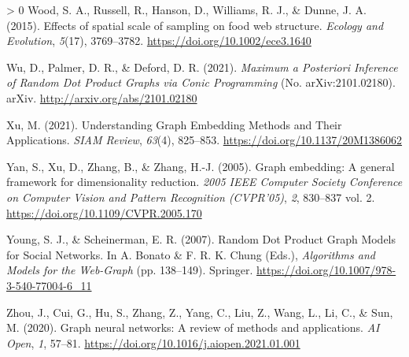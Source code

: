 \documentclass[11pt]{article}
\newlength{\cslhangindent}
\newenvironment{CSLReferences}[3] %
 {%
  \setlength{\parindent}{0pt}
  \ifodd #1 \everypar{\setlength{\hangindent}{\cslhangindent}}\ignorespaces\fi
  \ifnum #2 > 0
  \setlength{\parskip}{#2\baselineskip}
  \fi
 }%
 {}
\begin{document}
\begin{CSLReferences}{1}{0}
\leavevmode\hypertarget{ref-Wood2015EffSpa}{}%
Wood, S. A., Russell, R., Hanson, D., Williams, R. J., \& Dunne, J. A.
(2015). Effects of spatial scale of sampling on food web structure.
\emph{Ecology and Evolution}, \emph{5}(17), 3769--3782.
\url{https://doi.org/10.1002/ece3.1640}

\leavevmode\hypertarget{ref-Wu2021MaxPos}{}%
Wu, D., Palmer, D. R., \& Deford, D. R. (2021). \emph{Maximum a
Posteriori Inference of Random Dot Product Graphs via Conic Programming}
(No. arXiv:2101.02180). arXiv. \url{http://arxiv.org/abs/2101.02180}

\leavevmode\hypertarget{ref-Xu2021UndGra}{}%
Xu, M. (2021). Understanding Graph Embedding Methods and Their
Applications. \emph{SIAM Review}, \emph{63}(4), 825--853.
\url{https://doi.org/10.1137/20M1386062}

\leavevmode\hypertarget{ref-Yan2005GraEmb}{}%
Yan, S., Xu, D., Zhang, B., \& Zhang, H.-J. (2005). Graph embedding: A
general framework for dimensionality reduction. \emph{2005 IEEE Computer
Society Conference on Computer Vision and Pattern Recognition
(CVPR'05)}, \emph{2}, 830--837 vol. 2.
\url{https://doi.org/10.1109/CVPR.2005.170}

\leavevmode\hypertarget{ref-Young2007RanDot}{}%
Young, S. J., \& Scheinerman, E. R. (2007). Random Dot Product Graph
Models for Social Networks. In A. Bonato \& F. R. K. Chung (Eds.),
\emph{Algorithms and Models for the Web-Graph} (pp. 138--149). Springer.
\url{https://doi.org/10.1007/978-3-540-77004-6_11}

\leavevmode\hypertarget{ref-Zhou2020GraNeu}{}%
Zhou, J., Cui, G., Hu, S., Zhang, Z., Yang, C., Liu, Z., Wang, L., Li,
C., \& Sun, M. (2020). Graph neural networks: A review of methods and
applications. \emph{AI Open}, \emph{1}, 57--81.
\url{https://doi.org/10.1016/j.aiopen.2021.01.001}

\end{CSLReferences}
\end{document}
